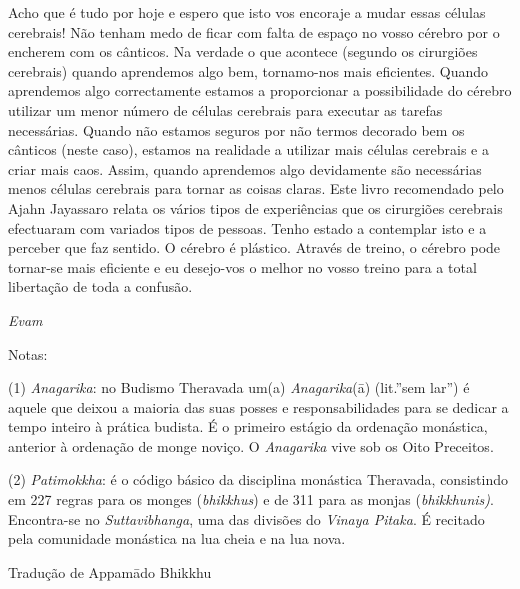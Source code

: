 Acho que é tudo por hoje e espero que isto vos encoraje a mudar essas
células cerebrais! Não tenham medo de ficar com falta de espaço no vosso
cérebro por o encherem com os cânticos. Na verdade o que acontece
(segundo os cirurgiões cerebrais) quando aprendemos algo bem,
tornamo-nos mais eficientes. Quando aprendemos algo correctamente
estamos a proporcionar a possibilidade do cérebro utilizar um menor
número de células cerebrais para executar as tarefas necessárias. Quando
não estamos seguros por não termos decorado bem os cânticos (neste
caso), estamos na realidade a utilizar mais células cerebrais e a criar
mais caos. Assim, quando aprendemos algo devidamente são necessárias
menos células cerebrais para tornar as coisas claras. Este livro
recomendado pelo Ajahn Jayassaro relata os vários tipos de experiências
que os cirurgiões cerebrais efectuaram com variados tipos de pessoas.
Tenho estado a contemplar isto e a perceber que faz sentido. O cérebro é
plástico. Através de treino, o cérebro pode tornar-se mais eficiente e
eu desejo-vos o melhor no vosso treino para a total libertação de toda a
confusão.

\emph{Evam}

Notas:

(1) \emph{Anagarika}: no Budismo Theravada um(a) \emph{Anagarika}(ā)
(lit.''sem lar'') é aquele que deixou a maioria das suas posses e
responsabilidades para se dedicar a tempo inteiro à prática budista. É o
primeiro estágio da ordenação monástica, anterior à ordenação de monge
noviço. O \emph{Anagarika} vive sob os Oito Preceitos.

(2) \emph{Patimokkha}: é o código básico da disciplina monástica
Theravada, consistindo em 227 regras para os monges (\emph{bhikkhus}) e
de 311 para as monjas (\emph{bhikkhunis)}. Encontra-se no
\emph{Suttavibhanga}, uma das divisões do \emph{Vinaya Pitaka}. É
recitado pela comunidade monástica na lua cheia e na lua nova.

Tradução de Appamādo Bhikkhu
